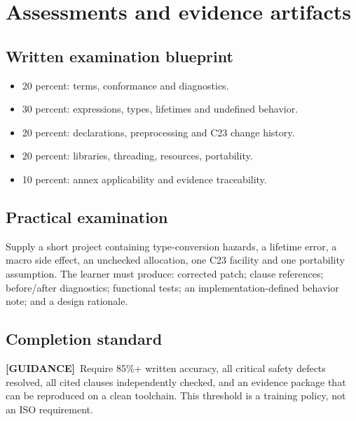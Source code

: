 \documentclass[10pt,letterpaper,oneside]{report}
\newcommand{\guidance}{\textbf{[GUIDANCE]}}
\begin{document}
\chapter{Assessments and evidence artifacts}
\section{Written examination blueprint}
\begin{itemize}\item 20 percent: terms, conformance and diagnostics.
\item 30 percent: expressions, types, lifetimes and undefined behavior.
\item 20 percent: declarations, preprocessing and C23 change history.
\item 20 percent: libraries, threading, resources, portability.
\item 10 percent: annex applicability and evidence traceability.\end{itemize}
\section{Practical examination}
Supply a short project containing type-conversion hazards, a lifetime error, a macro side effect, an unchecked allocation, one C23 facility and one portability assumption. The learner must produce: corrected patch; clause references; before/after diagnostics; functional tests; an implementation-defined behavior note; and a design rationale.
\section{Completion standard}
\guidance\ Require 85\%+ written accuracy, all critical safety defects resolved, all cited clauses independently checked, and an evidence package that can be reproduced on a clean toolchain. This threshold is a training policy, not an ISO requirement.
\end{document}
